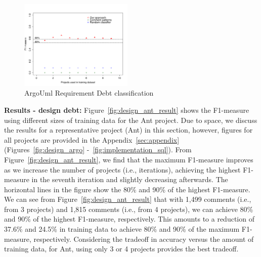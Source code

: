 \begin{figure}[t]
  \centering
  \includegraphics[width = 0.48\textwidth]{figures/implementation_argo}
  \vspace{-3mm}
  \caption{ArgoUml Requirement Debt classification}
  \label{fig:implementation_argo_result}
\end{figure}


\noindent \textbf{Results - design debt:} Figure~\ref{fig:design_ant_result} shows the F1-measure using different sizes of training data for the Ant project. Due to space, we discuss the results for a representative project (Ant) in this section, however, figures for all projects are provided in the Appendix~\ref{sec:appendix} (Figures~\ref{fig:design_argo} -~\ref{fig:implementation_sql}). From Figure~\ref{fig:design_ant_result}, we find that the maximum F1-measure improves as we increase the number of projects (i.e., iterations), achieving the highest F1-measure in the seventh iteration and slightly decreasing afterwards. The horizontal lines in the figure show the 80\% and 90\% of the highest F1-measure. We can see from Figure~\ref{fig:design_ant_result} that with 1,499 comments (i.e., from 3 projects) and 1,815 comments (i.e., from 4 projects), we can achieve 80\% and 90\% of the highest F1-measure, respectively. This amounts to a reduction of  37.6\% and 24.5\% in training data to achieve 80\% and 90\% of the maximum F1-measure, respectively. Considering the tradeoff in accuracy versus the amount of training data, for Ant, using only 3 or 4 projects provides the best tradeoff.


